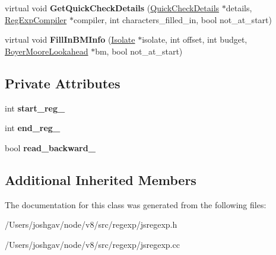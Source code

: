 \begin{DoxyCompactItemize}
\item 
virtual void {\bfseries Get\+Quick\+Check\+Details} (\hyperlink{classv8_1_1internal_1_1_quick_check_details}{Quick\+Check\+Details} $\ast$details, \hyperlink{classv8_1_1internal_1_1_reg_exp_compiler}{Reg\+Exp\+Compiler} $\ast$compiler, int characters\+\_\+filled\+\_\+in, bool not\+\_\+at\+\_\+start)\hypertarget{classv8_1_1internal_1_1_back_reference_node_a3df1913104dfd6615350926bdbfa2a73}{}\label{classv8_1_1internal_1_1_back_reference_node_a3df1913104dfd6615350926bdbfa2a73}

\item 
virtual void {\bfseries Fill\+In\+B\+M\+Info} (\hyperlink{classv8_1_1internal_1_1_isolate}{Isolate} $\ast$isolate, int offset, int budget, \hyperlink{classv8_1_1internal_1_1_boyer_moore_lookahead}{Boyer\+Moore\+Lookahead} $\ast$bm, bool not\+\_\+at\+\_\+start)\hypertarget{classv8_1_1internal_1_1_back_reference_node_a83fc2ebf5ed700dbfb2674f77ff9f218}{}\label{classv8_1_1internal_1_1_back_reference_node_a83fc2ebf5ed700dbfb2674f77ff9f218}

\end{DoxyCompactItemize}
\subsection*{Private Attributes}
\begin{DoxyCompactItemize}
\item 
int {\bfseries start\+\_\+reg\+\_\+}\hypertarget{classv8_1_1internal_1_1_back_reference_node_af623c85f6116cb2401efd2286fd5e9aa}{}\label{classv8_1_1internal_1_1_back_reference_node_af623c85f6116cb2401efd2286fd5e9aa}

\item 
int {\bfseries end\+\_\+reg\+\_\+}\hypertarget{classv8_1_1internal_1_1_back_reference_node_a4eb551c88318a586d1b15657ae02fd1f}{}\label{classv8_1_1internal_1_1_back_reference_node_a4eb551c88318a586d1b15657ae02fd1f}

\item 
bool {\bfseries read\+\_\+backward\+\_\+}\hypertarget{classv8_1_1internal_1_1_back_reference_node_ac68f5ed6489a54933d0e2cda9d854294}{}\label{classv8_1_1internal_1_1_back_reference_node_ac68f5ed6489a54933d0e2cda9d854294}

\end{DoxyCompactItemize}
\subsection*{Additional Inherited Members}


The documentation for this class was generated from the following files\+:\begin{DoxyCompactItemize}
\item 
/\+Users/joshgav/node/v8/src/regexp/jsregexp.\+h\item 
/\+Users/joshgav/node/v8/src/regexp/jsregexp.\+cc\end{DoxyCompactItemize}
